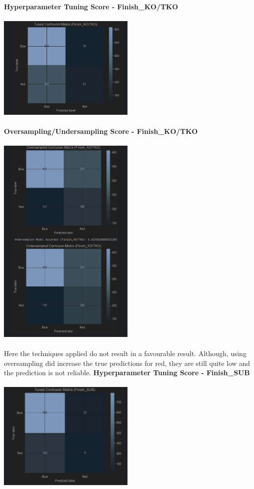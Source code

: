 \documentclass{article}
\begin{document}
	{\large \textbf{Hyperparameter Tuning Score - Finish\_KO/TKO}}\\\\
	\includegraphics[width=0.5\textwidth]{images/CM_Hyp_KO-TKO.png}\\\\
	{\large \textbf{Oversampling/Undersampling Score - Finish\_KO/TKO}}\\\\
	\includegraphics[width=0.5\textwidth]{images/CM_U_O_KO-TKO.png}\\\\
	Here the techniques applied do not result in a favourable result. Although, using oversampling did increase the true predictions for red, they are still quite low and the prediction is not reliable.
	\newpage
	{\large \textbf{Hyperparameter Tuning Score - Finish\_SUB}}\\\\
	\includegraphics[width=0.5\textwidth]{images/CM_Hyp_SUB.png}\\\\
\end{document}
